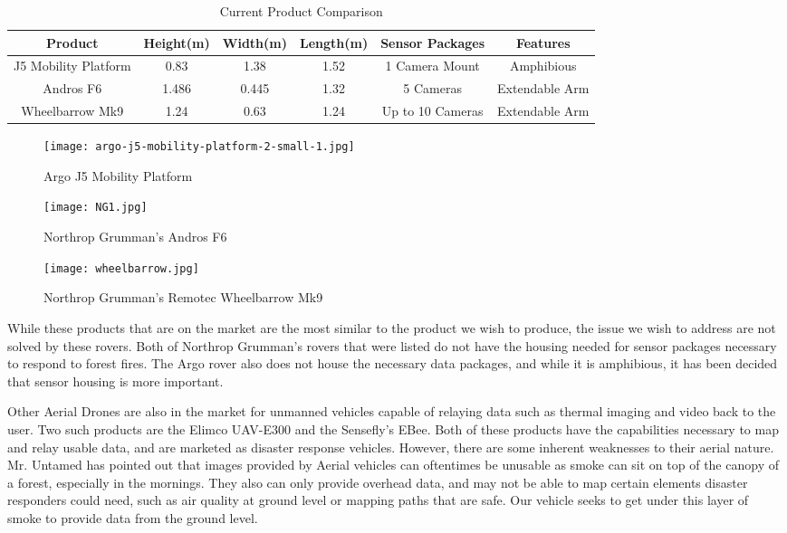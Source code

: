 \begin{table}[H]
	\begin{adjustwidth}{-.5in}{-.5in}
		\centering
		\begin{tabular}{c|c|c|c|c|c}
			Product & Height(m) & Width(m) & Length(m) & Sensor Packages & Features\\\hline
			J5 Mobility Platform & 0.83 & 1.38 & 1.52 & 1 Camera Mount & Amphibious\\
			Andros F6 & 1.486 & 0.445 & 1.32 & 5 Cameras & Extendable Arm \\
			Wheelbarrow Mk9 & 1.24 & 0.63 & 1.24 & Up to 10 Cameras & Extendable Arm\\
		\end{tabular}
		\caption{\label{tab:current} Current Product Comparison}
	\end{adjustwidth}
\end{table}

\begin{figure}[H]
	\centering
	\texttt{[image: argo-j5-mobility-platform-2-small-1.jpg]}
	\caption{Argo J5 Mobility Platform}
	\label{fig:ArgoPlatform}
\end{figure}


\begin{figure}[H]
	\centering
	\texttt{[image: NG1.jpg]}
	\caption{Northrop Grumman's Andros F6}
	\label{fig:NorthropAndros}
\end{figure}

\begin{figure}[H]
	\centering
	\texttt{[image: wheelbarrow.jpg]}
	\caption{Northrop Grumman's Remotec Wheelbarrow Mk9}
	\label{fig:NorthropWheelbarrow}
\end{figure}

While these products that are on the market are the most similar to the product we wish to produce, the issue we wish to address are not solved by these rovers. Both of Northrop Grumman's rovers that were listed do not have the housing needed for sensor packages necessary to respond to forest fires. The Argo rover also does not house the necessary data packages, and while it is amphibious, it has been decided that sensor housing is more important.

Other Aerial Drones are also in the market for unmanned vehicles capable of relaying data such as thermal imaging and video back to the user. Two such products are the Elimco UAV-E300 and the Sensefly's EBee. Both of these products have the capabilities necessary to map and relay usable data, and are marketed as disaster response vehicles. However, there are some inherent weaknesses to their aerial nature. Mr. Untamed has pointed out that images provided by Aerial vehicles can oftentimes be unusable as smoke can sit on top of the canopy of a forest, especially in the mornings. They also can only provide overhead data, and may not be able to map certain elements disaster responders could need, such as air quality at ground level or mapping paths that are safe. Our vehicle seeks to get under this layer of smoke to provide data from the ground level.

